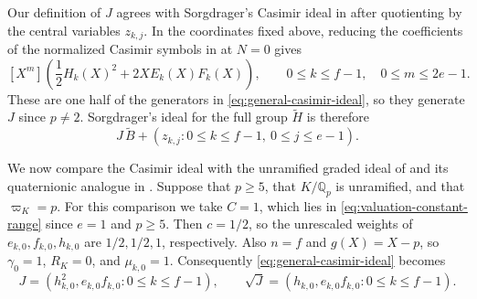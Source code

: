 \documentclass[11pt]{article}
\numberwithin{equation}{section}
\theoremstyle{definition}
\theoremstyle{remark}
\newcommand{\Q}{\mathbb Q}
\begin{document}
Our definition of $J$ agrees with Sorgdrager's Casimir ideal in
\cite[proof of Thm.~6.2, (22)--(24)]{Sor26b} after quotienting by
the central variables $z_{k,j}$. In the coordinates fixed above,
reducing the coefficients of the normalized Casimir symbols in
\cite[(22)]{Sor26b} at $N=0$ gives
\[
 [X^m]\left(\frac12 H_k(X)^2+2X E_k(X)F_k(X)\right),
 \qquad 0\leq k\leq f-1,\quad 0\leq m\leq 2e-1.
\]
These are one half of the generators in
\eqref{eq:general-casimir-ideal}, so they generate $J$ since
$p\ne2$. Sorgdrager's ideal for the full group $\widetilde H$
is therefore
\[
 J\,\widetilde B+(z_{k,j}:0\leq k\leq f-1,\ 0\leq j\leq e-1).
\]

We now compare the Casimir ideal with the unramified graded ideal
of \cite{BHH23} and its quaternionic analogue in \cite{HW24}.
Suppose that $p\geq5$, that $K/\Q_p$ is unramified, and that
$\varpi_K=p$. For this comparison we take $C=1$, which lies in
\eqref{eq:valuation-constant-range} since $e=1$ and $p\geq5$.
Then $c=1/2$, so the unrescaled weights of
$e_{k,0},f_{k,0},h_{k,0}$ are $1/2,1/2,1$, respectively.
Also $n=f$ and
$g(X)=X-p$, so $\gamma_0=1$, $R_K=0$, and $\mu_{k,0}=1$.
Consequently \eqref{eq:general-casimir-ideal} becomes
\[
 J=(h_{k,0}^2,e_{k,0}f_{k,0}:0\leq k\leq f-1),\qquad
 \sqrt J=(h_{k,0},e_{k,0}f_{k,0}:0\leq k\leq f-1).
\]
\end{document}
